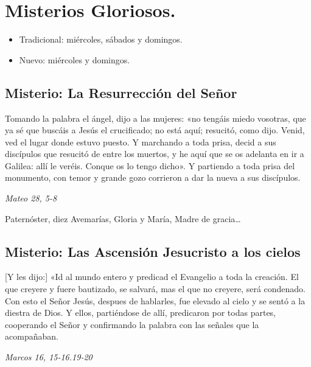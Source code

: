 \documentclass[./rosary.tex]{subfiles}
\newcounter{glorious-counter}
\begin{document}
\section*{Misterios Gloriosos.}
\begin{itemize}
      \item Tradicional: miércoles, sábados y domingos.
      \item Nuevo: miércoles y domingos.
\end{itemize}

\subsection*{ Misterio: La Resurrección del Señor}

Tomando la palabra el ángel, dijo a las mujeres: «no tengáis miedo vosotras, que ya sé que buscáis a Jesús el crucificado;
no está aquí; resucitó, como dijo. Venid, ved el lugar donde estuvo puesto. Y marchando a toda prisa,
decid a sus discípulos que resucitó de entre los muertos, y he aquí que se os adelanta en ir a Galilea: allí le veréis.
Conque os lo tengo dicho». Y partiendo a toda prisa del monumento, con temor y grande gozo corrieron a dar la nueva a sus discípulos.

\begin{flushright}
      \emph{Mateo 28, 5-8}
\end{flushright}

Paternóster, diez Avemarías, Gloria y María, Madre de gracia{\ldots}

\bigskip

\subsection*{ Misterio: Las Ascensión Jesucristo a los cielos}

[Y les dijo:] «Id al mundo entero y predicad el Evangelio a toda la creación. El que creyere y fuere bautizado,
se salvará, mas el que no creyere, será condenado. Con esto el Señor Jesús, despues de hablarles,
fue elevado al cielo y se sentó a la diestra de Dios. Y ellos, partiéndose de allí,
predicaron por todas partes, cooperando el Señor y confirmando la palabra con las señales que la acompañaban.

\begin{flushright}
      \emph{Marcos 16, 15-16.19-20}
\end{flushright}
\end{document}
